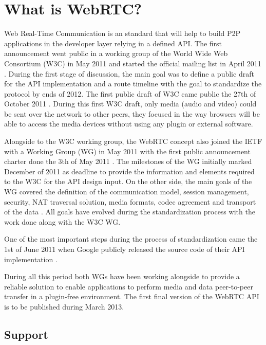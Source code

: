 \section{What is WebRTC?}

\thispagestyle{empty}

Web Real-Time Communication is an standard that will help to build P2P applications in the developer layer relying in a defined API. The first announcement went public in a working group of the World Wide Web Consortium (W3C) in May 2011 \cite{webrtcW3cgroup} and started the official mailing list in April 2011 \cite{welcomeW3C}. During the first stage of discussion, the main goal was to define a public draft for the API implementation and a route timeline with the goal to standardize the protocol by ends of 2012. The first public draft of W3C came public the 27th of October 2011 \cite{originalW3Cdraft}. During this first W3C draft, only media (audio and video) could be sent over the network to other peers, they focused in the way browsers will be able to access the media devices without using any plugin or external software.

Alongside to the W3C working group, the WebRTC concept also joined the IETF with a Working Group (WG) in May 2011 \cite{webrtcIETFgroup} with the first public announcement charter done the 3th of May 2011 \cite{webrtcIETFcharter}. The milestones of the WG initially marked December of 2011 as deadline to provide the information and elements required to the W3C for the API design input. On the other side, the main goals of the WG covered the definition of the communication model, session management, security, NAT traversal solution, media formats, codec agreement and transport of the data \cite{webrtcIETFcharter}. All goals have evolved during the standardization process with the work done along with the W3C WG.

One  of the most important steps during the process of standardization came the 1st of June 2011 when Google publicly released the source code of their API implementation \cite{haraldpublicWebRTC}. 

During all this period both WGs have been working alongside to provide a reliable solution to enable applications to perform media and data peer-to-peer transfer in a plugin-free environment. The first final version of the WebRTC API is to be published during March 2013.

\subsection{Support}

